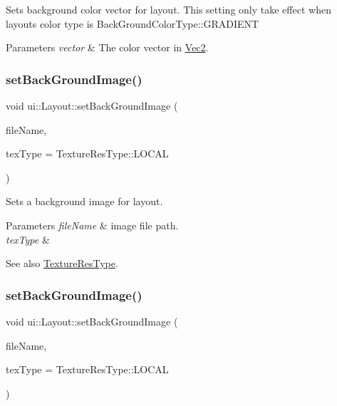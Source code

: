 Sets background color vector for layout. This setting only take effect when layout\textquotesingle{}s color type is Back\+Ground\+Color\+Type\+::\+G\+R\+A\+D\+I\+E\+NT


\begin{DoxyParams}{Parameters}
{\em vector} & The color vector in {\ttfamily \hyperlink{classVec2}{Vec2}}. \\
\hline
\end{DoxyParams}
\mbox{\label{classui_1_1Layout_aa33fbde02d2a60b7cb09b8fe3868b885}} 
\subsubsection{\texorpdfstring{set\+Back\+Ground\+Image()}{setBackGroundImage()}\hspace{0.1cm}{\footnotesize\ttfamily [1/2]}}
{\footnotesize\ttfamily void ui\+::\+Layout\+::set\+Back\+Ground\+Image (\begin{DoxyParamCaption}\item[{const std\+::string \&}]{file\+Name,  }\item[{\hyperlink{classui_1_1Widget_a040a65ec5ad3b11119b7e16b98bd9af0}{Texture\+Res\+Type}}]{tex\+Type = {\ttfamily TextureResType\+:\+:LOCAL} }\end{DoxyParamCaption})}

Sets a background image for layout.


\begin{DoxyParams}{Parameters}
{\em file\+Name} & image file path. \\
\hline
{\em tex\+Type} & \\
\hline
\end{DoxyParams}
\begin{DoxySeeAlso}{See also}
\hyperlink{classui_1_1Widget_a040a65ec5ad3b11119b7e16b98bd9af0}{Texture\+Res\+Type}. 
\end{DoxySeeAlso}
\mbox{\label{classui_1_1Layout_aa33fbde02d2a60b7cb09b8fe3868b885}} 
\subsubsection{\texorpdfstring{set\+Back\+Ground\+Image()}{setBackGroundImage()}\hspace{0.1cm}{\footnotesize\ttfamily [2/2]}}
{\footnotesize\ttfamily void ui\+::\+Layout\+::set\+Back\+Ground\+Image (\begin{DoxyParamCaption}\item[{const std\+::string \&}]{file\+Name,  }\item[{\hyperlink{classui_1_1Widget_a040a65ec5ad3b11119b7e16b98bd9af0}{Texture\+Res\+Type}}]{tex\+Type = {\ttfamily TextureResType\+:\+:LOCAL} }\end{DoxyParamCaption})}

